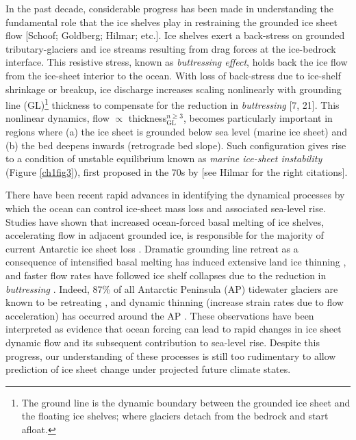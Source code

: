 In the past decade, considerable progress has been made in understanding the
fundamental role that the ice shelves play in restraining the grounded ice sheet
flow [Schoof; Goldberg; Hilmar; etc.]. Ice shelves exert a back-stress on
grounded tributary-glaciers and ice streams resulting from drag forces
at the ice-bedrock interface. This resistive stress, known as \emph{buttressing effect},
holds back the ice flow from the ice-sheet interior to the ocean.
With loss of back-stress due to ice-shelf shrinkage or breakup, ice discharge
increases scaling nonlinearly with grounding line (GL)\footnote{The ground line
is the dynamic boundary between the grounded ice sheet and the floating ice shelves;
where glaciers detach from the bedrock and start afloat.} thickness to
compensate for the reduction in \emph{buttressing} [7, 21]. This nonlinear dynamics,
flow $\propto$ thickness$^{n \geqslant 3}_\text{GL}$, becomes particularly important in
regions where (a) the ice sheet is
grounded below sea level (marine ice sheet) and (b) the bed deepens inwards
(retrograde bed slope). Such configuration gives rise to a condition of unstable
equilibrium known as \emph{marine ice-sheet instability} (Figure \ref{ch1fig3}),
first proposed in the 70s by [see Hilmar for the right citations].

There have been recent rapid advances in identifying the dynamical processes by which the
ocean can control ice-sheet mass loss and associated sea-level rise. Studies have shown that
increased ocean-forced basal melting of ice shelves, accelerating flow in adjacent grounded ice,
is responsible for the majority of current Antarctic ice sheet loss \parencite{Rignot2008,
Pritchard2009}. Dramatic grounding line retreat as a consequence
of intensified basal melting has induced extensive land ice thinning \parencite{Wingham2009,
Pritchard2009, Rignot2014}, and faster flow rates have followed ice shelf collapses
due to the reduction in \emph{buttressing} \parencite{Rignot2004, Rignot2005, Scambos2004}.
Indeed, 87\% of all Antarctic Peninsula (AP) tidewater glaciers are known to be retreating
\parencite{Cook2005}, and dynamic thinning (increase strain rates due to flow acceleration)
has occurred around the AP \parencite{Rignot2008, Pritchard2009}.
These observations have been interpreted as evidence that
ocean forcing can lead to rapid changes in ice sheet dynamic flow and its subsequent
contribution to sea-level rise. Despite this progress, our understanding of these processes
is still too rudimentary to allow prediction of ice sheet change under projected
future climate states.

